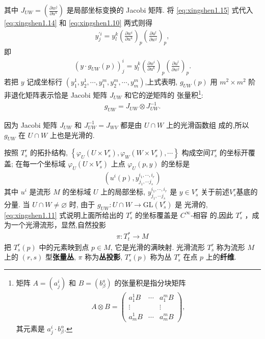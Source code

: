 其中 $J_{U W}=\left(\frac{\partial w^j}{\partial u^k}\right)$ 是局部坐标变换的 Jacobi 矩阵. 将 \eqref{eq:xingshen1.15} 式代入 \eqref{eq:xingshen1.14} 和 \eqref{eq:xingshen1.10} 两式则得
\begin{align*}
y_j^{\prime i}=y_l^k\left(\frac{\partial w^i}{\partial u^k}\right)_p\left(\frac{\partial u^l}{\partial w^j}\right)_p,
\end{align*}
即
\begin{align*}
\left(y \cdot g_{U W}(p)\right)_{j}^i=y^k_l\left(\frac{\partial w^i}{\partial u^k}\right)_p\left(\frac{\partial u^l}{\partial w^j}\right)_p .
\end{align*}
若把 $y$ 记成坐标行 $\left(y_1^1, y_2^1, \cdots, y_1^m, y_2^m, \cdots, y_m^m\right)$,上式表明, $g_{UW}(p)$ 用 $m^2 \times m^2$ 阶非退化矩阵表示恰是 Jacobi 矩阵 $J_{U W}$ 和它的逆矩阵的 张量积\footnote{矩阵 $A=\left(a_j^i\right)$ 和 $B=\left(b_\beta^a\right)$ 的张量积是指分块矩阵
\begin{align*}
A \otimes B=\left(\begin{array}{ccc}
a_1^1 B & \cdots & a_1^m B \\
\vdots & & \vdots \\
a_m^1 B & \cdots & a_m^m B
\end{array}\right),
\end{align*}
其元素是 $a_j^i \cdot b_\beta^\alpha$.}:
\begin{align*}
g_{U W}=J_{U W} \otimes J_{U W}^{-1} .
\end{align*}

因为 Jacobi 矩阵 $J_{U W }$ 和 $J_{U W}^{-1}=J_{W V}$ 都是由 $U \cap W$ 上的光滑函数组 成的,所以 $g_{U W}$ 在 $U \cap W$ 上也是光滑的.

按照 $T_s^r$ 的拓扑结构, $\left\{\varphi_U\left(U \times V_s^r\right), \varphi_W\left(W \times V_s^r\right), \cdots\right\}$ 构成空间$T_s^r$ 的坐标开覆盖; 在每一个坐标域 $\varphi_U\left(U \times V_s^r\right)$ 上点 $\varphi_U(p, y)$ 的坐标是
\begin{align*}
\left(u^i(p), y_{j_1, \cdots j_s}^{i_1, \cdots ,i_r}\right)
\end{align*}
其中 $u^i$ 是流形 $M$ 的坐标域 $U$ 上的局部坐标, $y_{j_1, \cdots j_s}^{i_1, \cdots ,i_r}$ 是 $y \in V_s^r$ 关于前述$V^r_s$基底的分量. 当 $U \cap W \neq \varnothing$ 时, 由于 $g _{UW}: U \cap W \rightarrow \mathrm{GL}\left(V_s^r\right)$ 是 光滑的, \eqref{eq:xingshen1.11} 式说明上面所给出的 $T_s^r$ 的坐标覆盖是 $C^{\infty}$-相容 的,因此 $T^r_s$ ，成为一个光滑流形，显然,自然投影
\begin{align*}
\pi: T_t^* \rightarrow M
\end{align*}
把 $T_s^r(p)$ 中的元素映到点 $p \in M$, 它是光滑的满映射. 光滑流形 $T_s^r$ 称为流形 $M$ 上的 $(r, s)$ 型\textbf{张量丛}, $\pi$ 称为\textbf{丛投影}, $T_s^r(p)$ 称为丛 $T_s^r$ 在点 $p$ 上的\textbf{纤维}.

